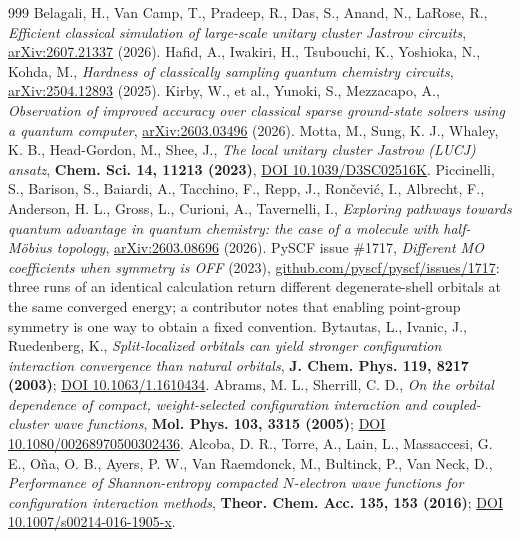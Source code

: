 \documentclass[onecolumn,a4paper]{quantumarticle}
\begin{document}
\begin{thebibliography}{999}
 Belagali, H., Van Camp, T., Pradeep, R., Das, S., Anand, N., LaRose, R., \emph{Efficient classical simulation of large-scale unitary cluster Jastrow circuits}, \href{https://arxiv.org/abs/2607.21337}{arXiv:2607.21337} (2026).
 Hafid, A., Iwakiri, H., Tsubouchi, K., Yoshioka, N., Kohda, M., \emph{Hardness of classically sampling quantum chemistry circuits}, \href{https://arxiv.org/abs/2504.12893}{arXiv:2504.12893} (2025).
 Kirby, W., et al., Yunoki, S., Mezzacapo, A., \emph{Observation of improved accuracy over classical sparse ground-state solvers using a quantum computer}, \href{https://arxiv.org/abs/2603.03496}{arXiv:2603.03496} (2026).
 Motta, M., Sung, K. J., Whaley, K. B., Head-Gordon, M., Shee, J., \emph{The local unitary cluster Jastrow (LUCJ) ansatz}, \textbf{Chem. Sci. 14, 11213 (2023)}, \href{https://doi.org/10.1039/D3SC02516K}{DOI 10.1039/D3SC02516K}.
 Piccinelli, S., Barison, S., Baiardi, A., Tacchino, F., Repp, J., Ron\v{c}evi\'c, I., Albrecht, F., Anderson, H. L., Gross, L., Curioni, A., Tavernelli, I., \emph{Exploring pathways towards quantum advantage in quantum chemistry: the case of a molecule with half-M\"obius topology}, \href{https://arxiv.org/abs/2603.08696}{arXiv:2603.08696} (2026).
 PySCF issue \#1717, \emph{Different MO coefficients when symmetry is OFF} (2023), \href{https://github.com/pyscf/pyscf/issues/1717}{github.com/pyscf/pyscf/issues/1717}: three runs of an identical calculation return different degenerate-shell orbitals at the same converged energy; a contributor notes that enabling point-group symmetry is one way to obtain a fixed convention.
 Bytautas, L., Ivanic, J., Ruedenberg, K., \emph{Split-localized orbitals can yield stronger configuration interaction convergence than natural orbitals}, \textbf{J. Chem. Phys. 119, 8217 (2003)}; \href{https://doi.org/10.1063/1.1610434}{DOI 10.1063/1.1610434}.
 Abrams, M. L., Sherrill, C. D., \emph{On the orbital dependence of compact, weight-selected configuration interaction and coupled-cluster wave functions}, \textbf{Mol. Phys. 103, 3315 (2005)}; \href{https://doi.org/10.1080/00268970500302436}{DOI 10.1080/00268970500302436}.
 Alcoba, D. R., Torre, A., Lain, L., Massaccesi, G. E., O\~na, O. B., Ayers, P. W., Van Raemdonck, M., Bultinck, P., Van Neck, D., \emph{Performance of Shannon-entropy compacted $N$-electron wave functions for configuration interaction methods}, \textbf{Theor. Chem. Acc. 135, 153 (2016)}; \href{https://doi.org/10.1007/s00214-016-1905-x}{DOI 10.1007/s00214-016-1905-x}.

\end{thebibliography}
\end{document}

